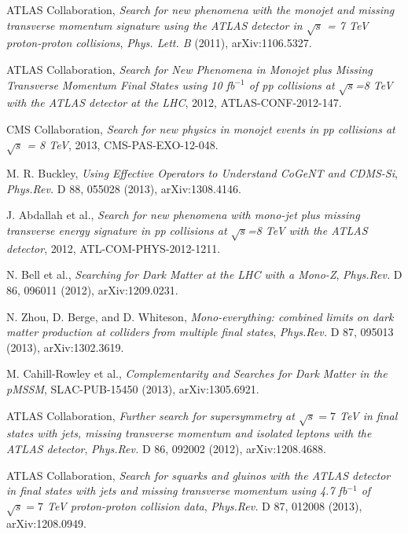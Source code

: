 %
%

ATLAS Collaboration, \emph{Search for new phenomena with the monojet and missing transverse momentum signature using the ATLAS detector in $\sqrt{s}$ = 7 TeV proton-proton collisions}, \emph{Phys. Lett. B} (2011), arXiv:1106.5327.

ATLAS Collaboration, \emph{Search for New Phenomena in Monojet plus Missing Transverse Momentum Final States using 10 fb$^{-1}$ of pp collisions at $\sqrt{s}$=8 TeV with the ATLAS detector at the LHC}, 2012, ATLAS-CONF-2012-147.

CMS Collaboration, \emph{Search for new physics in monojet events in pp collisions at $\sqrt{s}$ = 8 TeV}, 2013, CMS-PAS-EXO-12-048.

M. R. Buckley, \emph{Using Effective Operators to Understand CoGeNT and CDMS-Si}, \emph{Phys.Rev.} D 88, 055028 (2013), arXiv:1308.4146.

J. Abdallah et al., \emph{Search for new phenomena with mono-jet plus missing transverse energy signature in pp collisions at $\sqrt{s}$=8 TeV with the ATLAS detector}, 2012, ATL-COM-PHYS-2012-1211.

N. Bell et al., \emph{Searching for Dark Matter at the LHC with a Mono-Z}, \emph{Phys.Rev.} D 86, 096011 (2012), arXiv:1209.0231.

N. Zhou, D. Berge, and D. Whiteson, \emph{Mono-everything: combined limits on dark matter production at colliders from multiple final states}, \emph{Phys.Rev.} D 87, 095013 (2013), arXiv:1302.3619.

M. Cahill-Rowley et al., \emph{Complementarity and Searches for Dark Matter in the pMSSM}, SLAC-PUB-15450 (2013), arXiv:1305.6921.

ATLAS Collaboration, \emph{Further search for supersymmetry at $\sqrt{s}=7$ TeV in final states with jets, missing transverse momentum and isolated leptons with the ATLAS detector}, \emph{Phys.Rev.} D 86, 092002 (2012), arXiv:1208.4688.

ATLAS Collaboration, \emph{Search for squarks and gluinos with the ATLAS detector in final states with jets and missing transverse momentum using 4.7 fb$^{-1}$ of $\sqrt{s}=7$ TeV proton-proton collision data}, \emph{Phys.Rev.} D 87, 012008 (2013), arXiv:1208.0949.

